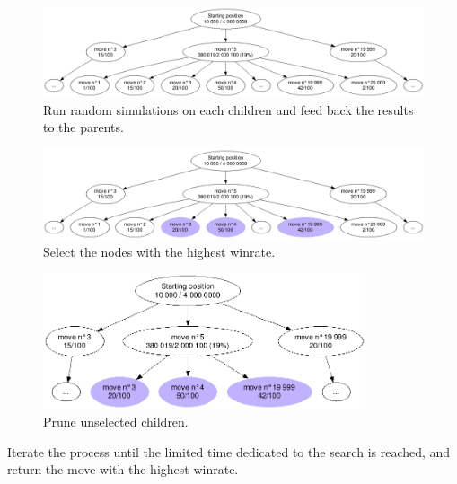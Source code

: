 \begin{figure}[H]
\centering
	\includegraphics[width=\textwidth]{3Methods/3.2MCTS/img/depth1.png}
	\caption{\label{fig:depth1}Run random simulations on each children and feed back the results to the parents.}
\end{figure}

\begin{figure}[H]
\centering
	\includegraphics[width=\textwidth]{3Methods/3.2MCTS/img/depth1-select.png}
	\caption{\label{fig:depth1-select}Select the nodes with the highest winrate.}
\end{figure}

\begin{figure}[H]
\centering
	\includegraphics[height=4cm]{3Methods/3.2MCTS/img/depth1-prune.png}
	\caption{\label{fig:depth1-prune}Prune unselected children.}
\end{figure}

Iterate the process until the limited time dedicated to the search is reached, and return the move with the highest winrate.